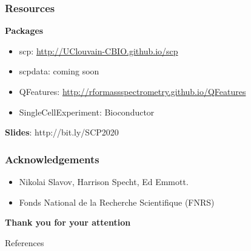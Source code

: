 \documentclass{beamer}
\newcommand{\hcode}[2][lgray]{{\ttfamily\color{vdgray}\colorbox{#1}{#2}}}
\newcommand{\frametitlesection}[1]{\frametitle{\centering #1 \footnotesize \hspace{0pt plus 1 filll} \insertsection}}
\begin{document}
\begin{frame}
    \frametitlesection{Resources}

    \textbf{Packages}

    \begin{itemize}
        \item \hcode{scp}: \url{http://UClouvain-CBIO.github.io/scp}
        \item \hcode{scpdata}: coming soon
        \item \hcode{QFeatures}: \url{http://rformassspectrometry.github.io/QFeatures}
        \item \hcode{SingleCellExperiment}: Bioconductor
    \end{itemize}


    \bigskip

    \textbf{Slides}: http://bit.ly/SCP2020

\end{frame}

\begin{frame}
    \frametitlesection{Acknowledgements}

    \begin{itemize}
    \item Nikolai Slavov, Harrison Specht, Ed Emmott.
    \item Fonds National de la Recherche Scientifique (FNRS)
    \end{itemize}

    \bigskip

    \textbf{Thank you for your attention}
    
    
\end{frame}




\begin{frame}[allowframebreaks]{References}
  \scriptsize
  
  
\end{frame}
\end{document}
